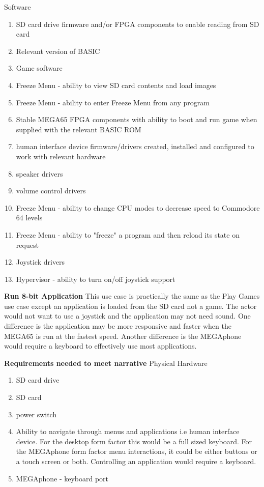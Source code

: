 Software
\begin{enumerate}
\item SD card drive firmware and/or FPGA components to enable reading from SD card
\item Relevant version of BASIC 
\item Game software
\item Freeze Menu - ability to view SD card contents and load images
\item Freeze Menu - ability to enter Freeze Menu from any program
\item Stable MEGA65 FPGA components with ability to boot and run game when supplied with the relevant BASIC ROM
\item human interface device firmware/drivers created, installed and configured to work with relevant hardware
\item speaker drivers
\item volume control drivers 
\item Freeze Menu - ability to change CPU modes to decrease speed to Commodore 64 levels
\item Freeze Menu - ability to "freeze" a program and then reload its state on request
\item Joystick drivers
\item Hypervisor - ability to turn on/off joystick support
\end{enumerate}

\textbf{Run 8-bit Application}
This use case is practically the same as the Play Games use case except an application is loaded from the SD card not a game. The actor would not want to use a joystick and the application may not need sound. One difference is the application may be more responsive and faster when the MEGA65 is run at the fastest speed. Another difference is the MEGAphone would require a keyboard to effectively use most applications.

\textbf{Requirements needed to meet narrative}
Physical Hardware
\begin{enumerate}
\item SD card drive
\item SD card
\item power switch
\item Ability to navigate through menus and applications i.e human interface device. For the desktop form factor this would be a full sized keyboard. For the MEGAphone form factor menu interactions, it could be either buttons or a touch screen or both. Controlling an application would require a keyboard.
\item MEGAphone - keyboard port
\end{enumerate}

